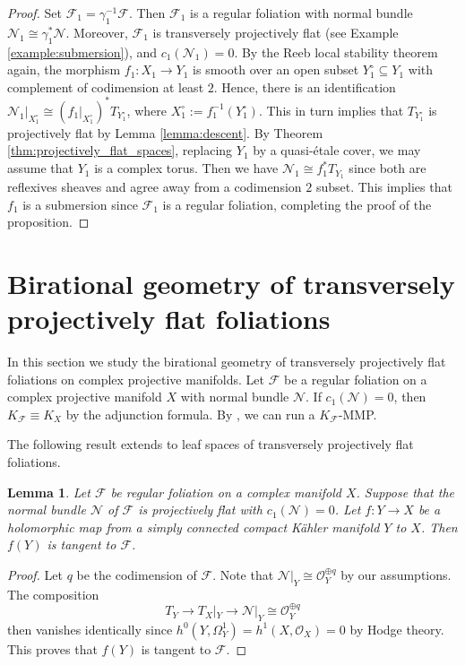 \documentclass[english,10pt]{amsart}
\newcommand{\cF}{\mathcal{F}}
\newcommand{\sN}{\mathscr{N}}
\newcommand{\sO}{\mathscr{O}}
\newtheorem{lemma}[thm]{Lemma}
\theoremstyle{definition}
\theoremstyle{remark}
\numberwithin{equation}{section}
\begin{document}
\begin{proof}
Set $\cF_1=\gamma_1^{-1}\cF$. Then $\cF_1$ is a regular foliation with normal bundle $\sN_1 \cong \gamma_1^*\sN$. Moreover, $\cF_1$ is transversely projectively flat (see Example \ref{example:submersion}), and $c_1(\sN_1)=0$. By the Reeb local stability theorem again, the morphism $f_1\colon X_1 \to Y_1$ is smooth over an open subset $Y_1^\circ \subseteq Y_1$ with complement of codimension at least $2$. Hence, there is an identification $\sN_1|_{X_1^\circ} \cong (f_1|_{X_1^\circ})^* T_{Y_1^\circ}$, where $X_1^\circ:=f_1^{-1}(Y_1^\circ)$. This in turn implies that $T_{Y_1^\circ}$ is projectively flat by Lemma \ref{lemma:descent}. By Theorem \ref{thm:projectively_flat_spaces}, replacing $Y_1$ by a quasi-\'etale cover, we may assume that $Y_1$ is a complex torus. Then we have $\sN_1 \cong f_1^*T_{Y_1}$ since both are reflexives sheaves and agree away from a codimension $2$ subset. This implies that $f_1$ is a submersion since $\cF_1$ is a regular foliation, completing the proof of the proposition. 
\end{proof}

\section{Birational geometry of transversely projectively flat foliations}\label{section:birational_geometry}

In this section we study the birational geometry of transversely projectively flat foliations on complex projective manifolds. Let $\cF$ be a regular foliation on a complex projective manifold $X$ with normal bundle $\sN$. If $c_1(\sN)=0$, then $K_\cF\equiv K_X$ by the adjunction formula. By \cite{bchm}, we can run a $K_\cF$-MMP. 

\medskip

The following result extends \cite[Proposition 2.1 (1)]{jahnke_radloff_13} to leaf spaces of transversely projectively flat foliations. 

\begin{lemma}\label{lemma:simply_connected_subvarieties_tangent}
Let $\cF$ be regular foliation on a complex manifold $X$. Suppose that the normal bundle $\sN$ of $\cF$ is projectively flat with $c_1(\sN)=0$. Let $f \colon Y \to X$ be a holomorphic map from a simply connected compact K\"{a}hler manifold $Y$ to $X$. Then $f(Y)$ is tangent to $\cF$.
\end{lemma}

\begin{proof}
Let $q$ be the codimension of $\cF$. Note that $\sN|_Y \cong \sO_Y^{\oplus q}$ by our assumptions. The composition 
\[
T_Y \to T_X|_Y\to \sN|_Y\cong \sO_Y^{\oplus q}
\]
then vanishes identically since $h^0(Y,\Omega_Y^1) = h^1(X,\sO_X) = 0$ by Hodge theory. This proves that $f(Y)$ is tangent to $\cF$.
\end{proof}
\end{document}
